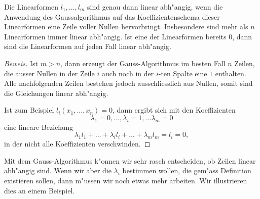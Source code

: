 \begin{hilfssatz}
Die Linearformen $l_1,\dots,l_m$ sind genau dann linear abh"angig, wenn
die Anwendung des Gaussalgorithmus auf das Koeffizientenschema dieser
Linearformen eine Zeile voller Nullen hervorbringt. Insbesondere sind
mehr als $n$ Linearformen immer linear abh"angig. Ist eine der Linearformen
bereits $0$, dann sind die Linearformen auf jeden Fall linear abh"angig.
\end{hilfssatz}

\begin{proof}[Beweis]
Ist $m>n$, dann erzeugt der Gauss-Algorithmus im besten Fall $n$ Zeilen,
die ausser Nullen in der Zeile $i$ auch noch in der $i$-ten Spalte eine
$1$ enthalten. Alle nachfolgenden Zeilen bestehen jedoch ausschliesslich
aus Nullen, somit sind die Gleichungen linear abh"angig.

Ist zum Beispiel $l_i(x_1,\dots,x_n)=0$, dann ergibt sich mit den
Koeffizienten
$$\lambda_1=0,\dots,\lambda_i=1,\dots \lambda_m=0$$
eine lineare Beziehung
$$\lambda_1l_1+\dots+\lambda_il_i+\dots+\lambda_ml_m=l_i=0,$$
in der nicht alle Koeffizienten verschwinden.
\end{proof}

Mit dem Gauss-Algorithmus k"onnen wir sehr rasch entscheiden, ob Zeilen 
linear abh"angig sind. Wenn wir aber die $\lambda_i$ bestimmen wollen,
die gem"ass Definition existieren sollen, dann m"ussen wir noch etwas
mehr arbeiten.
Wir illustrieren dies an einem Beispiel.

